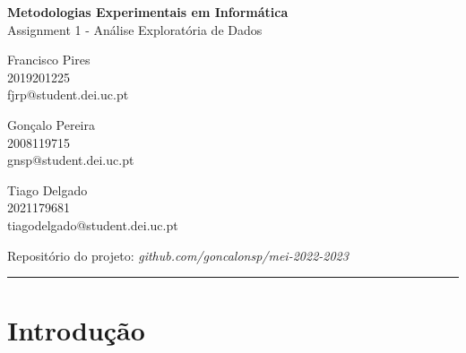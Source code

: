 \documentclass{uofa-eng-assignment}
\newcommand*{\course}{Metodologias Experimentais em Informática}
\newcommand*{\assignment}{Assignment 1 - Análise Exploratória de Dados}
\begin{document}

\begin{center}
    \textbf{\large \course}\\
    \assignment
\end{center}

\begin{center}
\begin{minipage}{0.3\textwidth}
\begin{center}Francisco Pires\\2019201225\\fjrp@student.dei.uc.pt\end{center}
\end{minipage}
\begin{minipage}{0.3\textwidth}
\begin{center}Gonçalo Pereira\\2008119715\\gnsp@student.dei.uc.pt\end{center}
\end{minipage}
\begin{minipage}{0.3\textwidth}
\begin{center}Tiago Delgado\\2021179681\\tiagodelgado@student.dei.uc.pt\end{center}
\end{minipage}
\end{center}

{\centering Repositório do projeto: \emph{github.com/goncalonsp/mei-2022-2023}\par }

\rule{0.9\linewidth}{0.1mm}

\section{Introdução }
\end{document}
